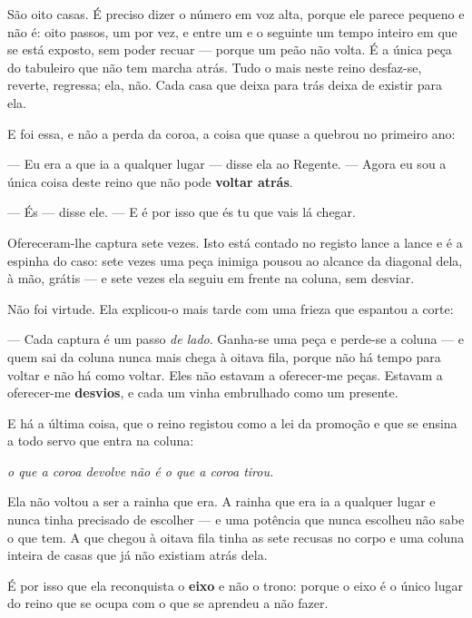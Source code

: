 \documentclass[livro.tex]{subfiles}
\begin{document}
\medskip

São oito casas. É preciso dizer o número em voz alta, porque ele parece pequeno e não é:
oito passos, um por vez, e entre um e o seguinte um tempo inteiro em que se está exposto,
sem poder recuar --- porque um peão não volta. É a única peça do tabuleiro que não tem
marcha atrás. Tudo o mais neste reino desfaz-se, reverte, regressa; ela, não. Cada casa que
deixa para trás deixa de existir para ela.

E foi essa, e não a perda da coroa, a coisa que quase a quebrou no primeiro ano:

--- Eu era a que ia a qualquer lugar --- disse ela ao Regente. --- Agora eu sou a única
coisa deste reino que não pode \textbf{voltar atrás}.

--- És --- disse ele. --- E é por isso que és tu que vais lá chegar.

\medskip

Ofereceram-lhe captura sete vezes. Isto está contado no registo lance a lance e é a
espinha do caso: sete vezes uma peça inimiga pousou ao alcance da diagonal dela, à mão,
grátis --- e sete vezes ela seguiu em frente na coluna, sem desviar.

Não foi virtude. Ela explicou-o mais tarde com uma frieza que espantou a corte:

--- Cada captura é um passo \emph{de lado}. Ganha-se uma peça e perde-se a coluna --- e
quem sai da coluna nunca mais chega à oitava fila, porque não há tempo para voltar e não
há como voltar. Eles não estavam a oferecer-me peças. Estavam a oferecer-me
\textbf{desvios}, e cada um vinha embrulhado como um presente.

\medskip

E há a última coisa, que o reino registou como a lei da promoção e que se ensina a todo
servo que entra na coluna:

\emph{o que a coroa devolve não é o que a coroa tirou.}

Ela não voltou a ser a rainha que era. A rainha que era ia a qualquer lugar e nunca tinha
precisado de escolher --- e uma potência que nunca escolheu não sabe o que tem. A que
chegou à oitava fila tinha as sete recusas no corpo e uma coluna inteira de casas que já não
existiam atrás dela.

É por isso que ela reconquista o \textbf{eixo} e não o trono: porque o eixo é o único lugar
do reino que se ocupa com o que se aprendeu a não fazer.

\end{document}
